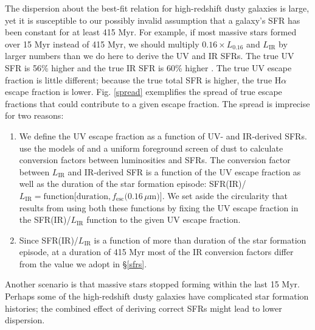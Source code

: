 \documentclass[referee]{aa}
\begin{document}
The dispersion about the best-fit relation for high-redshift dusty galaxies
is large, yet it is susceptible
to our possibly invalid assumption that a galaxy's SFR has been
constant for at least 415 Myr.  For example, if most
massive stars formed over 15 Myr instead of 415 Myr, we should multiply
$0.16 \times L_{0.16}$ and $L_{\mathrm{IR}}$ by larger numbers than we do here to derive the
UV and IR SFRs.  The true UV SFR is 56\% higher and the true IR SFR is 60\%
higher \citep{madau14}.  The true UV escape fraction is little different;
because the true total SFR is higher, the true H$\alpha$ escape fraction is
lower.  Fig. \ref{spread} exemplifies the spread of true escape fractions that
could contribute to a given escape fraction.  The spread is imprecise for two
reasons:
\begin{enumerate}
\item We define the UV escape fraction as a function of UV- and IR-derived SFRs.
\citet{madau14} use the models of \citet{conroy10} and a uniform foreground
screen of dust to calculate
conversion factors between luminosities and SFRs.  The
conversion factor between $L_{\mathrm{IR}}$ and
IR-derived SFR is a function of the UV escape fraction as well as the duration
of the star formation episode: SFR(IR)/$L_{\mathrm{IR}} = \mathrm{function}
[\mathrm{duration}, f_{\mathrm{esc}}(0.16\,\mu$m$)]$.  We set aside the
circularity that results from using both these functions by fixing the UV
escape fraction in the SFR(IR)/$L_{\mathrm{IR}}$ function to the
given UV escape fraction.
\item Since SFR(IR)/$L_{\mathrm{IR}}$ is a function of more than duration of the
star formation episode, at a duration of 415 Myr most of the IR
conversion factors differ from the value we adopt in \S\ref{sfrs}.
\end{enumerate}
Another scenario is that massive stars stopped forming within the last
15 Myr.  Perhaps some of the high-redshift dusty galaxies have
complicated star formation histories; the combined effect of deriving correct
SFRs might lead to lower dispersion.
\end{document}

